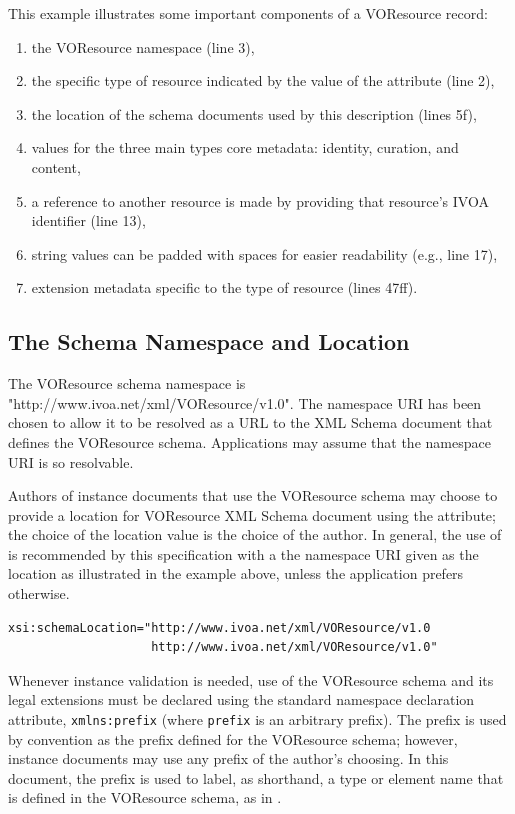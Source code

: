\documentclass[11pt,a4paper]{ivoa}
\begin{document}
This example illustrates some important components of a VOResource
record:

\begin{enumerate}
  \item the VOResource namespace (line 3),
  \item the specific type of resource indicated by
       the value of the  attribute (line 2),
  \item the location of the schema documents used by
       this description (lines 5f),
  \item values for the three main types core metadata:
       identity, curation, and content,
  \item a reference to another resource is made by
       providing that resource's IVOA identifier (line 13),
  \item string values can be padded with spaces
       for easier readability (e.g., line 17),
  \item extension metadata specific to the type of
       resource (lines 47ff).
\end{enumerate}


\subsection{The Schema Namespace and Location}

\label{sect:namespace}


The VOResource schema namespace is "http://www.ivoa.net/xml/VOResource/v1.0".
The namespace URI has been chosen to allow it to be resolved as a URL
to the XML Schema document that defines the VOResource schema.
Applications may assume that the namespace URI is so resolvable.

Authors of instance documents that use the VOResource schema may choose
to provide a location for VOResource XML Schema document using the
 attribute; the choice of the location value
is the choice of the author.  In general, the use of
 is recommended by this specification with
a the namespace URI given as the location as illustrated in the example
above, unless the application prefers otherwise.


\begin{lstlisting}
xsi:schemaLocation="http://www.ivoa.net/xml/VOResource/v1.0
                    http://www.ivoa.net/xml/VOResource/v1.0"
\end{lstlisting}

Whenever instance validation is needed, use of
the VOResource schema and its legal extensions must be declared using
the standard namespace declaration attribute, 
\verb|xmlns:prefix| (where \verb|prefix| is an arbitrary
prefix).  The prefix  is used by convention as the
prefix defined for the VOResource schema; however, instance documents
may use any prefix of the author's choosing.  In this document, the
 prefix is used to label, as shorthand, a type or
element name that is defined in the VOResource schema, as in
. 
\end{document}
